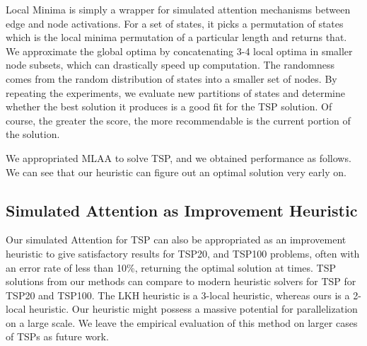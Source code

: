 \documentclass[10pt, conference, compsocconf]{IEEEtran}
\begin{document}
Local Minima is simply a wrapper for simulated attention mechanisms between edge and node activations. For a set of states, it picks a permutation of states which is the local minima permutation of a particular length and returns that. We approximate the global optima by concatenating 3-4 local optima in smaller node subsets, which can drastically speed up computation. The randomness comes from the random distribution of states into a smaller set of nodes. By repeating the experiments, we evaluate new partitions of states and determine whether the best solution it produces is a good fit for the TSP solution. Of course, the greater the score, the more recommendable is the current portion of the solution.



We appropriated MLAA to solve TSP, and we obtained performance as follows. We can see that our heuristic can figure out an optimal solution very early on. 

\subsection{Simulated Attention as Improvement Heuristic}

Our simulated Attention for TSP can also be appropriated as an improvement heuristic to give satisfactory results for TSP20, and TSP100 problems, often with an error rate of less than 10\%, returning the optimal solution at times. TSP solutions from our methods can compare to modern heuristic solvers for TSP for TSP20 and TSP100. The LKH heuristic is a 3-local heuristic, whereas ours is a 2-local heuristic. Our heuristic might possess a massive potential for parallelization on a large scale. We leave the empirical evaluation of this method on larger cases of TSPs as future work. 
\end{document}
